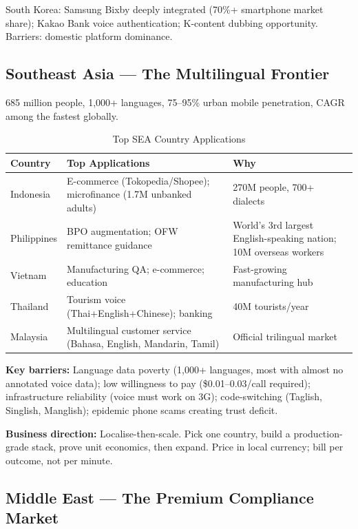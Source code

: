 \documentclass[12pt,a4paper]{article}
\begin{document}
South Korea: Samsung Bixby deeply integrated (70\%+ smartphone market
share); Kakao Bank voice authentication; K-content dubbing opportunity.
Barriers: domestic platform dominance.

\subsection{Southeast Asia --- The Multilingual Frontier}

685 million people, 1{,}000+ languages, 75--95\% urban mobile penetration,
CAGR among the fastest globally.

\begin{table}[H]\centering
\caption{Top SEA Country Applications}
\label{tab:sea-apps}
\small
\begin{tabularx}{\textwidth}{lL{4.6cm}X}
\toprule
\textbf{Country} & \textbf{Top Applications} & \textbf{Why} \\
\midrule
Indonesia   & E-commerce (Tokopedia/Shopee); microfinance (1.7M unbanked adults) & 270M people, 700+ dialects \\
Philippines & BPO augmentation; OFW remittance guidance & World's 3rd largest English-speaking nation; 10M overseas workers \\
Vietnam     & Manufacturing QA; e-commerce; education & Fast-growing manufacturing hub \\
Thailand    & Tourism voice (Thai+English+Chinese); banking & 40M tourists/year \\
Malaysia    & Multilingual customer service (Bahasa, English, Mandarin, Tamil) & Official trilingual market \\
\bottomrule
\end{tabularx}
\end{table}

\textbf{Key barriers:} Language data poverty (1{,}000+ languages, most with
almost no annotated voice data); low willingness to pay (\$0.01--0.03/call
required); infrastructure reliability (voice must work on 3G); code-switching
(Taglish, Singlish, Manglish); epidemic phone scams creating trust deficit.

\textbf{Business direction:} Localise-then-scale.  Pick one country, build
a production-grade stack, prove unit economics, then expand.  Price in local
currency; bill per outcome, not per minute.

\subsection{Middle East --- The Premium Compliance Market}
\end{document}
